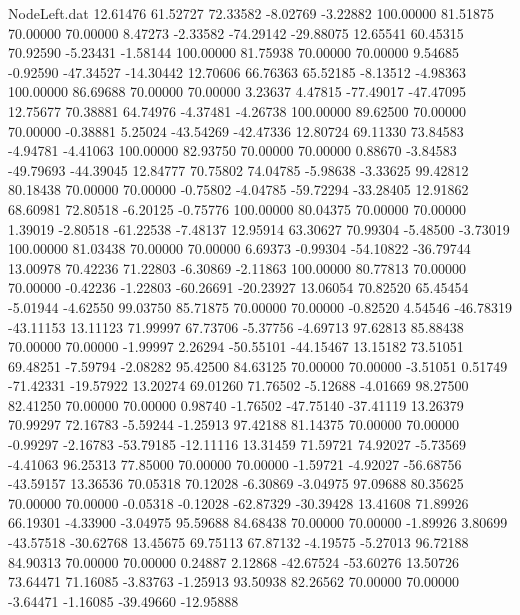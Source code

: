 \begin{filecontents}{NodeLeft.dat}
  12.61476   61.52727   72.33582    -8.02769   -3.22882  100.00000   81.51875   70.00000   70.00000    8.47273   -2.33582  -74.29142  -29.88075
  12.65541   60.45315   70.92590    -5.23431   -1.58144  100.00000   81.75938   70.00000   70.00000    9.54685   -0.92590  -47.34527  -14.30442
  12.70606   66.76363   65.52185    -8.13512   -4.98363  100.00000   86.69688   70.00000   70.00000    3.23637    4.47815  -77.49017  -47.47095
  12.75677   70.38881   64.74976    -4.37481   -4.26738  100.00000   89.62500   70.00000   70.00000   -0.38881    5.25024  -43.54269  -42.47336
  12.80724   69.11330   73.84583    -4.94781   -4.41063  100.00000   82.93750   70.00000   70.00000    0.88670   -3.84583  -49.79693  -44.39045
  12.84777   70.75802   74.04785    -5.98638   -3.33625   99.42812   80.18438   70.00000   70.00000   -0.75802   -4.04785  -59.72294  -33.28405
  12.91862   68.60981   72.80518    -6.20125   -0.75776  100.00000   80.04375   70.00000   70.00000    1.39019   -2.80518  -61.22538   -7.48137
  12.95914   63.30627   70.99304    -5.48500   -3.73019  100.00000   81.03438   70.00000   70.00000    6.69373   -0.99304  -54.10822  -36.79744
  13.00978   70.42236   71.22803    -6.30869   -2.11863  100.00000   80.77813   70.00000   70.00000   -0.42236   -1.22803  -60.26691  -20.23927
  13.06054   70.82520   65.45454    -5.01944   -4.62550   99.03750   85.71875   70.00000   70.00000   -0.82520    4.54546  -46.78319  -43.11153
  13.11123   71.99997   67.73706    -5.37756   -4.69713   97.62813   85.88438   70.00000   70.00000   -1.99997    2.26294  -50.55101  -44.15467
  13.15182   73.51051   69.48251    -7.59794   -2.08282   95.42500   84.63125   70.00000   70.00000   -3.51051    0.51749  -71.42331  -19.57922
  13.20274   69.01260   71.76502    -5.12688   -4.01669   98.27500   82.41250   70.00000   70.00000    0.98740   -1.76502  -47.75140  -37.41119
  13.26379   70.99297   72.16783    -5.59244   -1.25913   97.42188   81.14375   70.00000   70.00000   -0.99297   -2.16783  -53.79185  -12.11116
  13.31459   71.59721   74.92027    -5.73569   -4.41063   96.25313   77.85000   70.00000   70.00000   -1.59721   -4.92027  -56.68756  -43.59157
  13.36536   70.05318   70.12028    -6.30869   -3.04975   97.09688   80.35625   70.00000   70.00000   -0.05318   -0.12028  -62.87329  -30.39428
  13.41608   71.89926   66.19301    -4.33900   -3.04975   95.59688   84.68438   70.00000   70.00000   -1.89926    3.80699  -43.57518  -30.62768
  13.45675   69.75113   67.87132    -4.19575   -5.27013   96.72188   84.90313   70.00000   70.00000    0.24887    2.12868  -42.67524  -53.60276
  13.50726   73.64471   71.16085    -3.83763   -1.25913   93.50938   82.26562   70.00000   70.00000   -3.64471   -1.16085  -39.49660  -12.95888

\end{filecontents}
